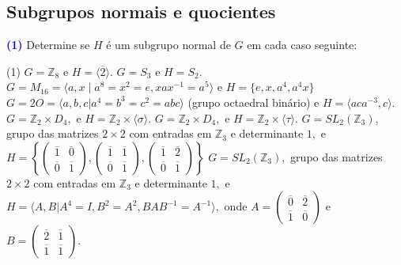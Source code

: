 \documentclass[12pt, a4paper]{article}
\newcommand{\negrito}[1]{\mbox{\boldmath{$#1$}}}
\begin{document}
\subsection{\textcolor{Floresta}{Subgrupos normais e quocientes}}
\textcolor{blue}{\bf(1)}\label{39} Determine se $H$ é um subgrupo normal de $G$ em cada caso seguinte:
\begin{tasks}[counter-format={(tsk[a])},label-width=3.6ex, label-format = {\bfseries}, column-sep = {0pt}](1)
\task[\textcolor{Floresta}{$\negrito{(a)} $}] $G = \mathbb{Z}_8$ e $H = \langle \overline{2} \rangle.$
\task[\textcolor{Floresta}{$\negrito{(b)} $}] $G = S_3$  e $H = S_2.$ %
\task[\textcolor{Floresta}{$\negrito{(c)} $}] $G = M_{16} = \langle a,x \mid a^8 = x^2 = e, xax^{-1} = a^5 \rangle$ e $H = \{e, x, a^4, a^4x \}$%
\task[\textcolor{Floresta}{$\negrito{(d)} $}] $G = 2O = \langle a,b, c |a^4 = b^3 = c^2 = abc \rangle$ (grupo octaedral binário) e $H = \langle aca^{-3}, c \rangle.$%
\task[\textcolor{Floresta}{$\negrito{(e)} $}] $G = \mathbb{Z}_2 \times D_4,$ e $H = \mathbb{Z}_2 \times \langle \sigma \rangle.$
\task[\textcolor{Floresta}{$\negrito{(f)} $}] $G = \mathbb{Z}_2 \times D_4,$ e $H = \mathbb{Z}_2 \times \langle \tau \rangle.$
\task[\textcolor{Floresta}{$\negrito{(g)} $}] $G = SL_2(\mathbb{Z}_3),$ grupo das matrizes $2 \times 2$ com entradas em $\mathbb{Z}_3$ e determinante $1,$ e $H = \left\{ \left(\begin{array}{cc} \overline{1} & \overline{0}\\
\overline{0} & \overline{1}
\end{array} \right), 
\left(\begin{array}{cc} \overline{1} & \overline{1}\\
\overline{0} & \overline{1}
\end{array} \right) ,
\left(\begin{array}{cc} \overline{1} & \overline{2}\\
\overline{0} & \overline{1}
\end{array} \right) \right\}$
\task[\textcolor{Floresta}{$\negrito{(h)} $}]$G = SL_2(\mathbb{Z}_3),$ grupo das matrizes $2 \times 2$ com entradas em $\mathbb{Z}_3$ e determinante $1,$ e $H = \langle A,B | A^4 = I, B^2 = A^2, BAB^{-1} = A^{-1} \rangle,$ onde $A = \left(\begin{array}{cc} \overline{0} & \overline{2}\\\overline{1} & \overline{0}\end{array} \right)$ e $B = \left(\begin{array}{cc} \overline{2} & \overline{1}\\\overline{1} & \overline{1}\end{array} \right).$

\end{tasks}
\end{document}
